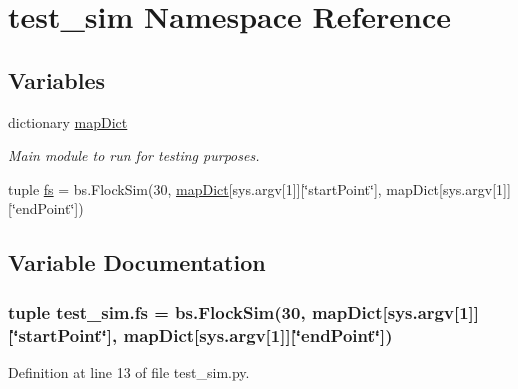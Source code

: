 \hypertarget{namespacetest__sim}{\section{test\-\_\-sim Namespace Reference}
\label{namespacetest__sim}
}
\subsection*{Variables}
\begin{DoxyCompactItemize}
\item 
dictionary \hyperlink{namespacetest__sim_a7550c4b395516fd2fa13ebfd927c9908}{map\-Dict}
\begin{DoxyCompactList}\small\item\em Main module to run for testing purposes. \end{DoxyCompactList}\item 
tuple \hyperlink{namespacetest__sim_a2054957d15e42445f7dc826058f9799d}{fs} = bs.\-Flock\-Sim(30, \hyperlink{namespacetest__sim_a7550c4b395516fd2fa13ebfd927c9908}{map\-Dict}\mbox{[}sys.\-argv\mbox{[}1\mbox{]}\mbox{]}\mbox{[}\char`\"{}start\-Point\char`\"{}\mbox{]}, map\-Dict\mbox{[}sys.\-argv\mbox{[}1\mbox{]}\mbox{]}\mbox{[}\char`\"{}end\-Point\char`\"{}\mbox{]})
\end{DoxyCompactItemize}


\subsection{Variable Documentation}
\hypertarget{namespacetest__sim_a2054957d15e42445f7dc826058f9799d}{
\subsubsection[{fs}]{\setlength{\rightskip}{0pt plus 5cm}tuple test\-\_\-sim.\-fs = bs.\-Flock\-Sim(30, {\bf map\-Dict}\mbox{[}sys.\-argv\mbox{[}1\mbox{]}\mbox{]}\mbox{[}\char`\"{}start\-Point\char`\"{}\mbox{]}, map\-Dict\mbox{[}sys.\-argv\mbox{[}1\mbox{]}\mbox{]}\mbox{[}\char`\"{}end\-Point\char`\"{}\mbox{]})}}\label{namespacetest__sim_a2054957d15e42445f7dc826058f9799d}


Definition at line 13 of file test\-\_\-sim.\-py.

